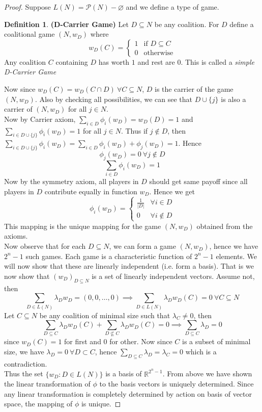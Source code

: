 \documentclass{article}
\theoremstyle{definition}
\newtheorem{defn}{Definition}[section]
\begin{document}
\begin{proof}
Suppose $L(N) = \mathcal{P}(N) -\varnothing$ and we define a type of game.
\begin{defn} 
\textbf{(D-Carrier Game)} Let $D\subseteq N$ be any coalition. For $D$ define a coalitional game $(N,w_D)$ where
\[
w_D(C) = 
\begin{cases}
	1 &\text{if } D\subseteq C\\
	0 &\text{otherwise}  
\end{cases}
\]
Any coalition $C$ containing $D$ has worth $1$ and rest are 0. This is called a \textit{simple D-Carrier Game}
\end{defn}
Now since $w_D(C) = w_D(C \cap D)~\forall C \subseteq N$, $D$ is the carrier of the game $(N,w_D)$. Also by checking all possibilities, we can see that $D \cup \{j\}$ is also a carrier of $(N,w_D)$ for all $j \in N$.\\
Now by Carrier axiom, $\sum_{i \in D} \phi_i(w_D) = w_D(D) = 1$ and $\sum_{i \in D\cup \{j\}} \phi_i(w_D) = 1$ for all $j \in N$. Thus if $j \notin D$, then $\sum_{i \in D\cup \{j\}} \phi_i(w_D) = \sum_{i \in D} \phi_i(w_D) + \phi_j(w_D) = 1$. Hence $$\phi_j(w_D) = 0 ~\forall j \notin D$$ $$\sum_{i \in D} \phi_i(w_D) = 1$$
Now by the symmetry axiom, all players in $D$ should get same payoff since all players in $D$ contribute equally in function $w_D$. Hence we get
\[
\phi_i(w_D) = 
\begin{cases}
	\frac{1}{|D|} & \forall i \in D\\
	0 &\forall i \notin D
\end{cases}
\]
This mapping is the unique mapping for the game $(N,w_D)$ obtained from the axioms.\\

Now observe that for each $D\subseteq N$, we can form a game $(N,w_D)$, hence we have $2^n - 1$ such games. Each game is a characteristic function of $2^n - 1$ elements. We will now show that these are linearly independent (i.e. form a basis). That is we now show that $(w_D)_{D\subseteq N}$ is a set of linearly independent vectors. Assume not, then 
$$\sum_{D \in L(N)} \lambda_Dw_D = (0,0,\dots,0) \implies \sum_{D \in L(N)} \lambda_Dw_D(C) = 0 ~\forall C \subseteq N$$ Let $C\subseteq N$ be any coalition of minimal size such that $\lambda_C \ne 0$, then $$\sum_{D\subseteq C}\lambda_Dw_D(C) + \sum_{D\nsubseteq C}\lambda_Dw_D(C) = 0 \implies \sum_{D\subseteq C} \lambda_D = 0$$ since $w_D(C) = 1$ for first and $0$ for other. Now since $C$ is a subset of minimal size, we have $\lambda_D = 0~\forall D\subset C$, hence $\sum_{D\subseteq C}\lambda_D = \lambda_C = 0$ which is a contradiction.\\
Thus the set $\{w_D: D \in L(N)\}$ is a basis of $\mathbb{R}^{2^n -1}$. From above we have shown the linear transformation of $\phi$ to the basis vectors is uniquely determined. Since any linear transformation is completely determined by action on basis of vector space, the mapping of $\phi$ is unique.
\end{proof}
\end{document}
